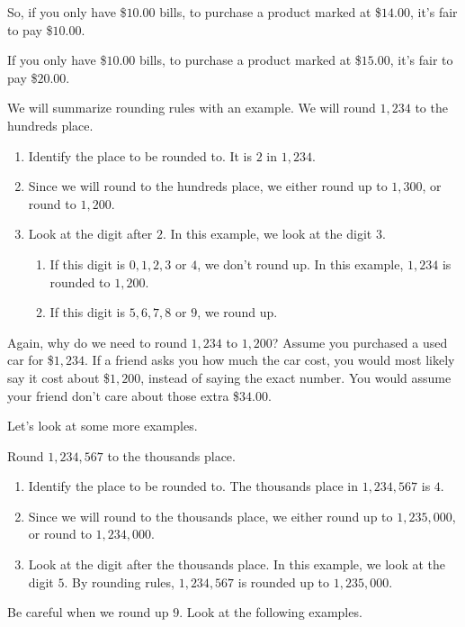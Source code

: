 So, if you only have \$$10.00$ bills, to purchase a product marked at \$$14.00$, it's fair to pay \$$10.00$.

If you only have \$$10.00$ bills, to purchase a product marked at \$$15.00$, it's fair to pay \$$20.00$.

We will summarize rounding rules with an example. We will round $1,234$ to the hundreds place.
\begin{enumerate}
\item Identify the place to be rounded to. It is $2$ in $1,234$.
\item Since we will round to the hundreds place, we either round up to $1,300$, or round to $1,200$.
\item Look at the digit after $2$. In this example, we look at the digit $3$.
	\begin{enumerate}
		\item If this digit is $0,1,2,3\text{ or }4$, we don't round up. In this example, $1,234$ is rounded to $1,200$.
		\item If this digit is $5,6,7,8\text{ or }9$, we round up.	
	\end{enumerate}
\end{enumerate}

Again, why do we need to round $1,234$ to $1,200$? Assume you purchased a used car for \$$1,234$. If a friend asks you how much the car cost, you would most likely say it cost about \$$1,200$, instead of saying the exact number. You would assume your friend don't care about those extra \$$34.00$.

Let's look at some more examples.

\begin{myexample}
Round $1,234,567$ to the thousands place.
\end{myexample}
\begin{solution}
\begin{enumerate}
\item Identify the place to be rounded to. The thousands place in $1,234,567$ is $4$.
\item Since we will round to the thousands place, we either round up to $1,235,000$, or round to $1,234,000$.
\item Look at the digit after the thousands place. In this example, we look at the digit $5$. By rounding rules, $1,234,567$ is rounded up to $1,235,000$.
\end{enumerate}
\end{solution}

Be careful when we round up $9$. Look at the following examples.


